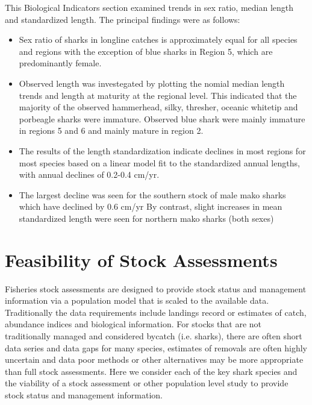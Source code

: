 \documentclass[12pt]{SCreport}
\begin{document}
This Biological Indicators section examined trends in sex ratio, median length and standardized length.  The principal findings were as follows:
\begin{itemize}
\item Sex ratio of sharks in longline catches is approximately equal for all species and regions with the exception of blue sharks in Region 5, which are predominantly female.
\item Observed length was investegated by plotting the nomial median length trends and length at
maturity at the regional level. This indicated that the majority of the observed hammerhead, silky,
thresher, oceanic whitetip and porbeagle sharks were immature. Observed blue shark were mainly
immature in regions 5 and 6 and mainly mature in region 2.
\item The results of the length standardization indicate declines in most regions for most species based
on a linear model fit to the standardized annual lengths, with annual declines of 0.2-0.4 cm/yr.
\item The largest decline was seen for the southern stock of male mako sharks which have declined by 0.6 cm/yr
By contrast, slight increases in mean standardized length were seen for northern mako sharks (both sexes)
\end{itemize}

      
 \clearpage     
      
\section{Feasibility of Stock Assessments}
Fisheries stock assessments are designed to provide stock status and management information via a population model that is scaled to the available data. Traditionally the data requirements include landings record or estimates of catch, abundance indices and biological information. For stocks that are not traditionally managed and considered bycatch (i.e. sharks), there are often short data series and data gaps for many species, estimates of removals are often highly uncertain and data poor methods or other alternatives may be more appropriate than full stock assessments. Here we consider each of the key shark species and the viability of a stock assessment or other population level study to provide stock status and management information.
\end{document}
